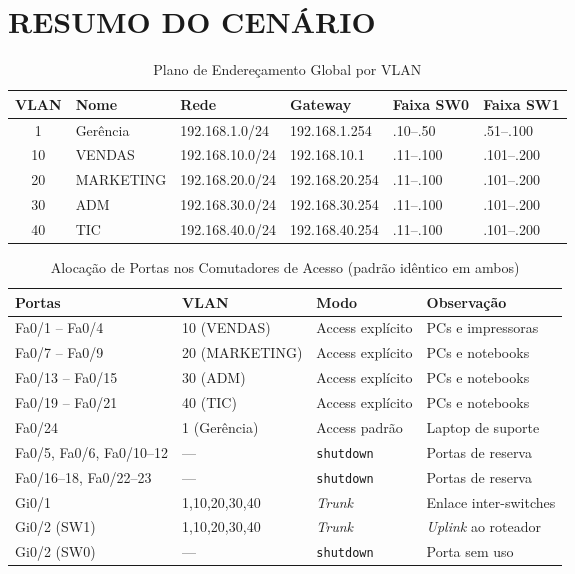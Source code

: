 \section{RESUMO DO CENÁRIO}

\begin{table}[htbp]
\centering
\caption{Plano de Endereçamento Global por VLAN}
\label{tab:enderecamento}
\small
\begin{tabular}{@{}clllll@{}}
\toprule
\textbf{VLAN} & \textbf{Nome} & \textbf{Rede} & \textbf{Gateway} &
\textbf{Faixa SW0} & \textbf{Faixa SW1} \\
\midrule
1  & Gerência  & 192.168.1.0/24  & 192.168.1.254   & .10–.50   & .51–.100  \\
10 & VENDAS    & 192.168.10.0/24 & 192.168.10.1    & .11–.100  & .101–.200 \\
20 & MARKETING & 192.168.20.0/24 & 192.168.20.254  & .11–.100  & .101–.200 \\
30 & ADM       & 192.168.30.0/24 & 192.168.30.254  & .11–.100  & .101–.200 \\
40 & TIC       & 192.168.40.0/24 & 192.168.40.254  & .11–.100  & .101–.200 \\
\bottomrule
\end{tabular}
\end{table}

\begin{table}[htbp]
\centering
\caption{Alocação de Portas nos Comutadores de Acesso (padrão idêntico em ambos)}
\label{tab:portas}
\small
\begin{tabular}{@{}p{4.0cm}p{2.4cm}p{2.4cm}p{3.8cm}@{}}
\toprule
\textbf{Portas} & \textbf{VLAN} & \textbf{Modo} & \textbf{Observação} \\
\midrule
Fa0/1 -- Fa0/4              & 10 (VENDAS)    & Access explícito  & PCs e impressoras \\
Fa0/7 -- Fa0/9              & 20 (MARKETING) & Access explícito  & PCs e notebooks \\
Fa0/13 -- Fa0/15            & 30 (ADM)       & Access explícito  & PCs e notebooks \\
Fa0/19 -- Fa0/21            & 40 (TIC)       & Access explícito  & PCs e notebooks \\
Fa0/24                      & 1 (Gerência)   & Access padrão     & Laptop de suporte \\
Fa0/5, Fa0/6, Fa0/10--12   & ---            & \texttt{shutdown} & Portas de reserva \\
Fa0/16--18, Fa0/22--23      & ---            & \texttt{shutdown} & Portas de reserva \\
Gi0/1                       & 1,10,20,30,40  & \textit{Trunk}    & Enlace inter-switches \\
Gi0/2 (SW1)                 & 1,10,20,30,40  & \textit{Trunk}    & \textit{Uplink} ao roteador \\
Gi0/2 (SW0)                 & ---            & \texttt{shutdown} & Porta sem uso \\
\bottomrule
\end{tabular}
\end{table}


